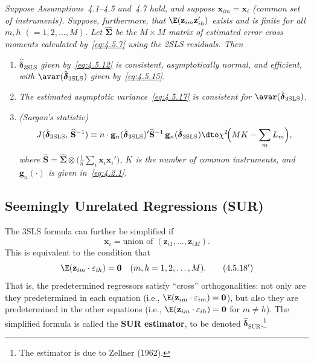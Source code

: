 \begin{proposition}
\label{prop:4.5}
\textit{Suppose Assumptions~4.1--4.5 and~4.7 hold, and suppose
$\mathbf{x}_{im} = \mathbf{x}_i$ (common set of instruments).
Suppose, furthermore, that\/ $\E(\mathbf{z}_{im} \mathbf{z}_{ih}')$ exists and is
finite for all $m, h$ $(= 1, 2, \ldots, M)$. Let\/ $\widehat{\boldsymbol{\Sigma}}$
be the $M \times M$ matrix of estimated error cross moments calculated
by~\eqref{eq:4.5.7} using the 2SLS residuals. Then}
\begin{enumerate}[label=(\alph*)]
\item $\hat{\boldsymbol{\delta}}_{\mathrm{3SLS}}$ \textit{given by~\eqref{eq:4.5.12}
is consistent, asymptotically normal, and efficient, with\/
$\avar(\hat{\boldsymbol{\delta}}_{\mathrm{3SLS}})$ given by~\eqref{eq:4.5.15}.}

\item \textit{The estimated asymptotic variance~\eqref{eq:4.5.17} is consistent for\/
$\avar(\hat{\boldsymbol{\delta}}_{\mathrm{3SLS}})$.}

\item \textit{(Sargan's statistic)}
\[
J(\hat{\boldsymbol{\delta}}_{\mathrm{3SLS}},\, \widehat{\mathbf{S}}^{-1})
\equiv n \cdot \mathbf{g}_n(\hat{\boldsymbol{\delta}}_{\mathrm{3SLS}})'
\widehat{\mathbf{S}}^{-1}\, \mathbf{g}_n(\hat{\boldsymbol{\delta}}_{\mathrm{3SLS}})
\dto \chi^2\!\Bigl(MK - \sum_m L_m\Bigr),
\]
\textit{where\/ $\widehat{\mathbf{S}} = \widehat{\boldsymbol{\Sigma}} \otimes
\bigl(\frac{1}{n} \sum_i \mathbf{x}_i \mathbf{x}_i'\bigr)$,
$K$ is the number of common instruments, and\/ $\mathbf{g}_n(\cdot)$ is given
in~\eqref{eq:4.2.1}.}
\end{enumerate}
\end{proposition}

\subsection*{Seemingly Unrelated Regressions (SUR)}

The 3SLS formula can further be simplified if
\begin{equation}
\mathbf{x}_i = \text{union of } (\mathbf{z}_{i1}, \ldots, \mathbf{z}_{iM}).
\label{eq:4.5.18}
\end{equation}
This is equivalent to the condition that
\begin{equation}
\E(\mathbf{z}_{im} \cdot \varepsilon_{ih}) = \mathbf{0}
\quad (m, h = 1, 2, \ldots, M).
\tag{4.5.18$'$}
\label{eq:4.5.18p}
\end{equation}
That is, the predetermined regressors satisfy ``cross'' orthogonalities: not only are
they predetermined in each equation (i.e., $\E(\mathbf{z}_{im} \cdot \varepsilon_{im}) = \mathbf{0}$),
but also they are predetermined in the other equations (i.e.,
$\E(\mathbf{z}_{im} \cdot \varepsilon_{ih}) = \mathbf{0}$ for $m \neq h$).
The simplified formula is called the \textbf{SUR estimator}, to be denoted
$\hat{\boldsymbol{\delta}}_{\mathrm{SUR}}$.\footnote{The estimator is due to Zellner (1962).}

